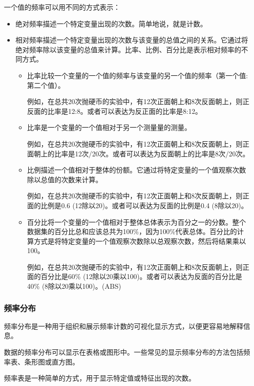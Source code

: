\documentclass[]{book}
\begin{document}
一个值的频率可以用不同的方式表示：

\begin{itemize}
\item
  绝对频率描述一个特定变量出现的次数。简单地说，就是计数。
\item
  相对频率描述一个特定变量出现的次数与该变量的总值之间的关系。它通过将绝对频率除以该变量的总值来计算。比率、比例、百分比是表示相对频率的不同方式。

  \begin{itemize}
  \item
    比率比较一个变量的一个值的频率与该变量的另一个值的频率（第一个值:第二个值）。

    例如，在总共20次抛硬币的实验中，有12次正面朝上和8次反面朝上，则正反面的比率是12:8。或者可以表达为反正面的比率是8:12。
  \item
    比率是一个变量的一个值相对于另一个测量量的测量。

    例如，在总共20次抛硬币的实验中，有12次正面朝上和8次反面朝上，则正面朝上的比率是12次/20次。或者可以表达为反面朝上的比率是8次/20次。
  \item
    比例描述一个值相对于整体的份额。它通过将特定变量的一个值观察次数除以总值的次数来计算。

    例如，在总共20次抛硬币的实验中，有12次正面朝上和8次反面朝上，则正面的比例是0.6 (12除以20)。或者可以表达为反面的比例是0.4 (8除以20)。
  \item
    百分比将一个变量的一个值相对于整体总体表示为百分之一的分数。整个数据集的百分比总和应该总共为100\%，因为100\%代表总体。百分比的计算方式是将特定变量的一个值观察次数除以总观察次数，然后将结果乘以100。

    例如，在总共20次抛硬币的实验中，有12次正面朝上和8次反面朝上，则正面的百分比是60\% (12除以20乘以100)。或者可以表达为反面的百分比是40\% (8除以20乘以100)。(ABS)
  \end{itemize}
\end{itemize}

\hypertarget{ux9891ux7387ux5206ux5e03}{%
\subsubsection{频率分布}\label{ux9891ux7387ux5206ux5e03}}

频率分布是一种用于组织和展示频率计数的可视化显示方式，以便更容易地解释信息。

数据的频率分布可以显示在表格或图形中。一些常见的显示频率分布的方法包括频率表、条形图或直方图。

频率表是一种简单的方式，用于显示特定值或特征出现的次数。
\end{document}

